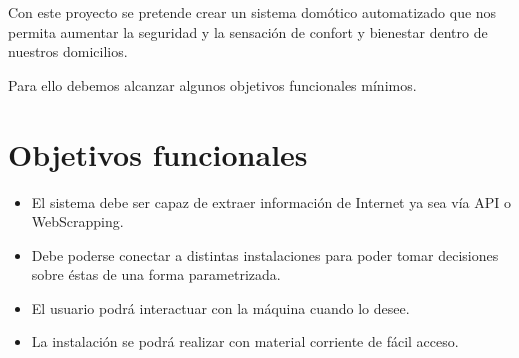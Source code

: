 
Con este proyecto se pretende crear un sistema domótico automatizado que nos permita aumentar la seguridad y la sensación de confort y bienestar dentro de nuestros domicilios.

Para ello debemos alcanzar algunos objetivos funcionales mínimos.

\section{Objetivos funcionales}

\begin{itemize}
    \item El sistema debe ser capaz de extraer información de Internet ya sea vía API o WebScrapping.
    \item Debe poderse conectar a distintas instalaciones para poder tomar decisiones sobre éstas de una forma parametrizada.
    \item El usuario podrá interactuar con la máquina cuando lo desee.
    \item La instalación se podrá realizar con material corriente de fácil acceso.
\end{itemize}

